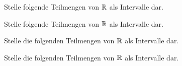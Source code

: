 \documentclass[11pt]{exam}
\begin{document}
\begin{questions}
\newpage
\noaddpoints
\question[\totalpoints]
\addpoints
Stelle folgende Teilmengen von $\mathbb{R}$ als Intervalle dar.

\noaddpoints
\question[\totalpoints]
\addpoints
Stelle folgende Teilmengen von $\mathbb{R}$ als Intervalle dar.

\noaddpoints
\question[\totalpoints]
\addpoints
Stelle die folgenden Teilmengen von $\mathbb{R}$ als Intervalle dar.

\noaddpoints
\question[\totalpoints]
\addpoints
Stelle die folgenden Teilmengen von $\mathbb{R}$ als Intervalle dar.
\end{questions}
\end{document}
